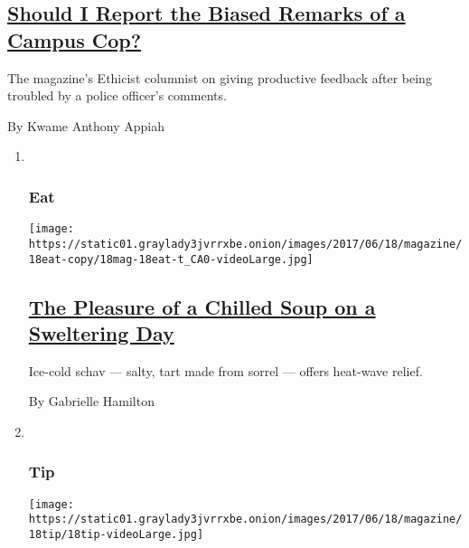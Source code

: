 \begin{enumerate}
  \hypertarget{should-i-report-the-biased-remarks-of-a-campus-cop}{%
  \subsection{\texorpdfstring{\href{/2017/06/14/magazine/should-i-report-the-biased-remarks-of-a-campus-cop.html}{Should
  I Report the Biased Remarks of a Campus
  Cop?}}{Should I Report the Biased Remarks of a Campus Cop?}}\label{should-i-report-the-biased-remarks-of-a-campus-cop}}

  The magazine's Ethicist columnist on giving productive feedback after
  being troubled by a police officer's comments.

  By Kwame Anthony Appiah
\end{enumerate}

\begin{enumerate}
\def\labelenumi{\arabic{enumi}.}
\item ~
  \hypertarget{eat}{%
  \subsubsection{Eat}\label{eat}}

  \texttt{[image: https://static01.graylady3jvrrxbe.onion/images/2017/06/18/magazine/18eat-copy/18mag-18eat-t\_CA0-videoLarge.jpg]}

  \hypertarget{the-pleasure-of-a-chilled-soup-on-a-sweltering-day}{%
  \subsection{\texorpdfstring{\href{/2017/06/15/magazine/the-pleasure-of-a-chilled-soup-on-a-sweltering-day.html}{The
  Pleasure of a Chilled Soup on a Sweltering
  Day}}{The Pleasure of a Chilled Soup on a Sweltering Day}}\label{the-pleasure-of-a-chilled-soup-on-a-sweltering-day}}

  Ice-cold schav --- salty, tart made from sorrel --- offers heat-wave
  relief.

  By Gabrielle Hamilton
\item ~
  \hypertarget{tip}{%
  \subsubsection{Tip}\label{tip}}

  \texttt{[image: https://static01.graylady3jvrrxbe.onion/images/2017/06/18/magazine/18tip/18tip-videoLarge.jpg]}

  \hypertarget{how-to-read-aloud-to-children}{%
}
\end{enumerate}
